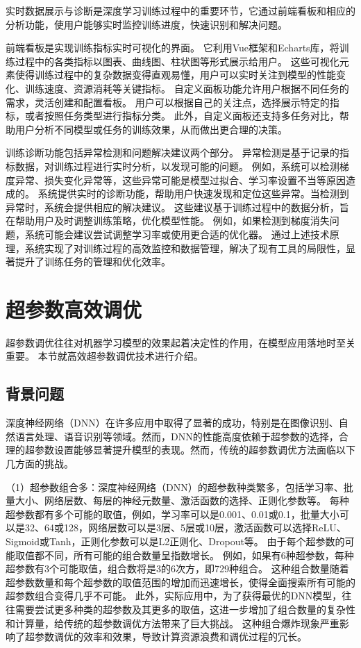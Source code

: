 实时数据展示与诊断是深度学习训练过程中的重要环节，它通过前端看板和相应的分析功能，使用户能够实时监控训练进度，快速识别和解决问题。

前端看板是实现训练指标实时可视化的界面。
它利用Vue框架和Echarts库，将训练过程中的各类指标以图表、曲线图、柱状图等形式展示给用户。
这些可视化元素使得训练过程中的复杂数据变得直观易懂，用户可以实时关注到模型的性能变化、训练速度、资源消耗等关键指标。
自定义面板功能允许用户根据不同任务的需求，灵活创建和配置看板。
用户可以根据自己的关注点，选择展示特定的指标，或者按照任务类型进行指标分类。
此外，自定义面板还支持多任务对比，帮助用户分析不同模型或任务的训练效果，从而做出更合理的决策。

训练诊断功能包括异常检测和问题解决建议两个部分。
异常检测是基于记录的指标数据，对训练过程进行实时分析，以发现可能的问题。
例如，系统可以检测梯度异常、损失变化异常等，这些异常可能是模型过拟合、学习率设置不当等原因造成的。
系统提供实时的诊断功能，帮助用户快速发现和定位这些异常。当检测到异常时，系统会提供相应的解决建议。
这些建议基于训练过程中的数据分析，旨在帮助用户及时调整训练策略，优化模型性能。
例如，如果检测到梯度消失问题，系统可能会建议尝试调整学习率或使用更合适的优化器。
通过上述技术原理，系统实现了对训练过程的高效监控和数据管理，解决了现有工具的局限性，显著提升了训练任务的管理和优化效率。


\section{超参数高效调优}

超参数调优往往对机器学习模型的效果起着决定性的作用，在模型应用落地时至关重要。
本节就高效超参数调优技术进行介绍。

\subsection{背景问题}

深度神经网络（DNN）在许多应用中取得了显著的成功，特别是在图像识别、自然语言处理、语音识别等领域。然而，DNN的性能高度依赖于超参数的选择，合理的超参数设置能够显著提升模型的表现。然而，传统的超参数调优方法面临以下几方面的挑战。

（1）超参数组合多：深度神经网络（DNN）的超参数种类繁多，包括学习率、批量大小、网络层数、每层的神经元数量、激活函数的选择、正则化参数等。
每种超参数都有多个可能的取值，例如，学习率可以是0.001、0.01或0.1，批量大小可以是32、64或128，网络层数可以是3层、5层或10层，激活函数可以选择ReLU、Sigmoid或Tanh，正则化参数可以是L2正则化、Dropout等。
由于每个超参数的可能取值都不同，所有可能的组合数量呈指数增长。
例如，如果有6种超参数，每种超参数有3个可能取值，组合数将是3的6次方，即729种组合。
这种组合数量随着超参数数量和每个超参数的取值范围的增加而迅速增长，使得全面搜索所有可能的超参数组合变得几乎不可能。
此外，实际应用中，为了获得最优的DNN模型，往往需要尝试更多种类的超参数及其更多的取值，这进一步增加了组合数量的复杂性和计算量，给传统的超参数调优方法带来了巨大挑战。
这种组合爆炸现象严重影响了超参数调优的效率和效果，导致计算资源浪费和调优过程的冗长。

